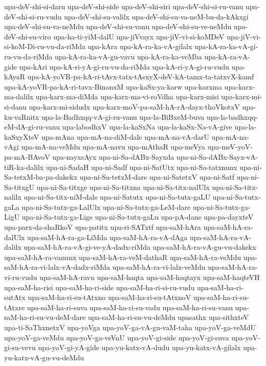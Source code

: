 {upa-deV-shi-si-daru
upa-deV-shi-side
upa-deV-shi-siri
upa-deV-shi-si-ru-vanu
upa-deV-shi-si-ru-vudu
upa-deV-shi-su-valilx
upa-deV-shi-su-va-neM-bu-da-kAkxgi
upa-deV-shi-su-va-neMdu
upa-deV-shi-su-vanu
upa-deV-shi-su-ve-neMdu
upa-deV-shi-su-viro
upa-ha-ti-yiM-dalU
upa-jiVvayx
upa-jiV-vi-si-koMDeV
upa-jiV-vi-si-koM-Di-ru-vu-da-riMda
upa-kAra
upa-kA-ra-ka-vA-gilalx
upa-kA-ra-ka-vA-gi-ru-vu-da-riMda
upa-kA-ra-ka-vA-gu-vavu
upa-kA-ra-ka-veMba
upa-kA-ra-vA-gide
upa-kAri
upa-kA-ri-yA-gi-ru-vu-da-riMda
upa-kA-ri-yA-gi-ru-vudu
upa-kAyaR
upa-kA-yoVR-pa-kA-ri-tAvx-tatx-tAsxyX-deV-kA-tamx-ta-tatxvX-kamf
upa-kA-yoVR-pa-kA-ri-tavx-BinanxM
upa-kaSx-ya-karw
upa-karxma
upa-karx-ma-dalilx
upa-karx-ma-diMda
upa-karx-ma-vi-roVdha
upa-karx-misi
upa-karx-mi-si-danu
upa-karx-mi-sidudx
upa-karx-moV-pa-saM-hA-rA-dayx-thoVkotxV
upa-ku-vaRnitx
upa-la-Badhxqq-vA-gi-ru-vanu
upa-la-BiBxeM-buva
upa-la-badhxqq-eM-dA-gi-ru-vanu
upa-labodhxV
upa-la-kaSxNa
upa-la-kaSx-Na-vA-give
upa-la-kaSxyXteV
upa-mAna
upa-mA-na-diM-dale
upa-mA-na-vA-darU
upa-mA-na-vAgi
upa-mA-na-veMdu
upa-mA-navu
upa-mAthaR
upa-meVya
upa-meV-yoV-pa-mA-BAvoV
upa-nayxsAyx
upa-ni-Sa-dABx-Sayxda
upa-ni-Sa-dABx-Sayx-vA-tiR-ka-dalilx
upa-ni-SadaH
upa-ni-Sadf
upa-ni-SatUtx
upa-ni-Sa-tatxnunx
upa-ni-Sa-tetxM-ba-pa-dakekx
upa-ni-Sa-tetxM-dare
upa-ni-SatetxV
upa-ni-Satf
upa-ni-Sa-titxgU
upa-ni-Sa-titxge
upa-ni-Sa-titxna
upa-ni-Sa-titx-nalUlx
upa-ni-Sa-titx-nalilx
upa-ni-Sa-titx-niM-dale
upa-ni-Satutx
upa-ni-Sa-tutx-gaLU
upa-ni-Sa-tutx-gaLa
upa-ni-Sa-tutx-ga-LalUlx
upa-ni-Sa-tutx-ga-LeM-dare
upa-ni-Sa-tutx-ga-LigU
upa-ni-Sa-tutx-ga-Lige
upa-ni-Sa-tutx-gaLu
upa-pA-dane
upa-pa-dayxteV
upa-parx-da-shaRkoV
upa-patitx
upa-ri-SATxtf
upa-saM-hAra
upa-saM-hA-ra-dalUlx
upa-saM-hA-ra-ga-LiMda
upa-saM-hA-ra-vA-dAga
upa-saM-hA-ra-vA-dalilx
upa-saM-hA-ra-vA-gi-ve-yA-dadx-riMda
upa-saM-hA-ra-vA-gu-vu-dakekx
upa-saM-hA-ra-vanunx
upa-saM-hA-ra-veM-dathaR
upa-saM-hA-ra-veMdu
upa-saM-hA-ra-vi-lalx-vA-dadx-riMda
upa-saM-hA-ra-vi-lalx-veMdu
upa-saM-hA-ra-vi-ru-vudu
upa-saM-hA-ravu
upa-saM-haqta
upa-saM-haqtayx
upa-saM-haqteVH
upa-saM-ha-risi
upa-saM-ha-ri-side
upa-saM-ha-ri-si-ru-vudu
upa-saM-ha-ri-sutAtx
upa-saM-ha-ri-su-tAtxno
upa-saM-ha-ri-su-tAtxnoV
upa-saM-ha-ri-su-tAtxre
upa-saM-ha-ri-suva
upa-saM-ha-ri-su-vadu
upa-saM-ha-ri-su-vanu
upa-saM-ha-ri-su-vu-deM-dare
upa-saM-ha-ri-su-vu-deMdu
upasathx
upa-sithxteV
upa-ti-SaThxnetxV
upa-yoVga
upa-yoV-ga-vA-gu-vaM-taha
upa-yoV-ga-veMdU
upa-yoV-ga-veMdu
upa-yoV-ga-veVnU
upa-yoV-gi-side
upa-yoV-gi-suva
upa-yoV-gi-su-vevu
upa-yoV-gi-yA-gide
upa-yu-katx-vA-dudu
upa-yu-katx-vA-gilalx
upa-yu-katx-vA-gu-vu-deMdu
}
